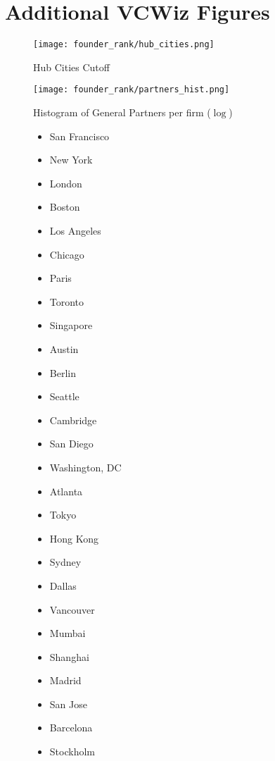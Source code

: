 \chapter{Additional VCWiz Figures}

\begin{figure}[ht]
  \texttt{[image: founder\_rank/hub\_cities.png]}
  \caption{Hub Cities Cutoff}
  \label{vcwiz:fig:hubscuttof}
  \centering
\end{figure}

\begin{figure}[ht]
  \texttt{[image: founder\_rank/partners\_hist.png]}
  \caption{Histogram of General Partners per firm ($\log$)}
  \label{vcwiz:fig:partners}
  \centering
\end{figure}

\begin{figure}[ht]
\begin{multicols}{2}
  \begin{itemize}
    \item San Francisco
    \item New York
    \item London
    \item Boston
    \item Los Angeles
    \item Chicago
    \item Paris
    \item Toronto
    \item Singapore
    \item Austin
    \item Berlin
    \item Seattle
    \item Cambridge
    \item San Diego
    \item Washington, DC
    \item Atlanta
    \item Tokyo
    \item Hong Kong
    \item Sydney
    \item Dallas
    \item Vancouver
    \item Mumbai
    \item Shanghai
    \item Madrid
    \item San Jose
    \item Barcelona
    \item Stockholm

\end{itemize}
\end{multicols}
\end{figure}
